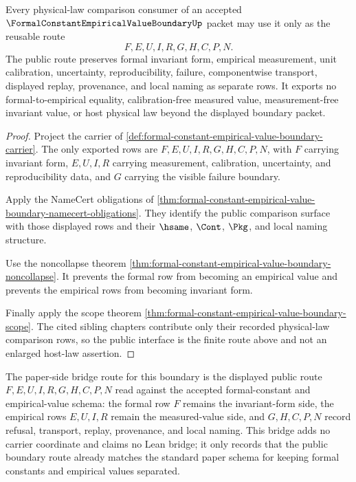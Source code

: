\begin{theorem}
\label{thm:formal-constant-empirical-value-boundary-public-export}
Every physical-law comparison consumer of an accepted $\FormalConstantEmpiricalValueBoundaryUp$ packet may use it only as the reusable route
$$
F,E,U,I,R,G,H,C,P,N .
$$
The public route preserves formal invariant form, empirical measurement, unit calibration, uncertainty, reproducibility, failure, componentwise transport, displayed replay, provenance, and local naming as separate rows. It exports no formal-to-empirical equality, calibration-free measured value, measurement-free invariant value, or host physical law beyond the displayed boundary packet.
\end{theorem}
\begin{proof}
Project the carrier of \autoref{def:formal-constant-empirical-value-boundary-carrier}. The only exported rows are $F,E,U,I,R,G,H,C,P,N$, with $F$ carrying invariant form, $E,U,I,R$ carrying measurement, calibration, uncertainty, and reproducibility data, and $G$ carrying the visible failure boundary.

Apply the NameCert obligations of \autoref{thm:formal-constant-empirical-value-boundary-namecert-obligations}. They identify the public comparison surface with those displayed rows and their $\hsame$, $\Cont$, $\Pkg$, and local naming structure.

Use the noncollapse theorem \autoref{thm:formal-constant-empirical-value-boundary-noncollapse}. It prevents the formal row from becoming an empirical value and prevents the empirical rows from becoming invariant form.

Finally apply the scope theorem \autoref{thm:formal-constant-empirical-value-boundary-scope}. The cited sibling chapters contribute only their recorded physical-law comparison rows, so the public interface is the finite route above and not an enlarged host-law assertion.
\end{proof}

The paper-side bridge route for this boundary is the displayed public route $F,E,U,I,R,G,H,C,P,N$ read against the accepted formal-constant and empirical-value schema: the formal row $F$ remains the invariant-form side, the empirical rows $E,U,I,R$ remain the measured-value side, and $G,H,C,P,N$ record refusal, transport, replay, provenance, and local naming. This bridge adds no carrier coordinate and claims no Lean bridge; it only records that the public boundary route already matches the standard paper schema for keeping formal constants and empirical values separated.

